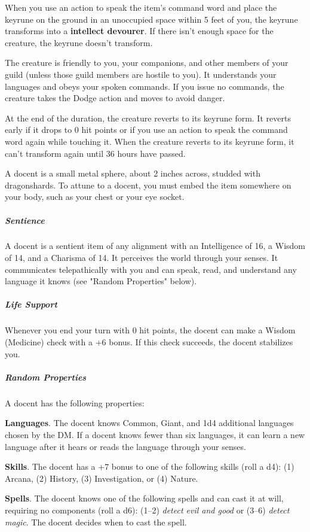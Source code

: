 \documentclass[10pt,a4paper,twoside,bg=print,twocolumn,openany,nodeprecatedcode]{dndbook}
\begin{document}
When you use an action to speak the item's command word and place the keyrune on the ground in an unoccupied space within 5 feet of you, the keyrune transforms into a \textbf{intellect devourer}. If there isn't enough space for the creature, the keyrune doesn't transform.

The creature is friendly to you, your companions, and other members of your guild (unless those guild members are hostile to you). It understands your languages and obeys your spoken commands. If you issue no commands, the creature takes the Dodge action and moves to avoid danger.

At the end of the duration, the creature reverts to its keyrune form. It reverts early if it drops to 0 hit points or if you use an action to speak the command word again while touching it. When the creature reverts to its keyrune form, it can't transform again until 36 hours have passed.

A docent is a small metal sphere, about 2 inches across, studded with dragonshards. To attune to a docent, you must embed the item somewhere on your body, such as your chest or your eye socket.

\subparagraph{Sentience}
A docent is a sentient item of any alignment with an Intelligence of 16, a Wisdom of 14, and a Charisma of 14. It perceives the world through your senses. It communicates telepathically with you and can speak, read, and understand any language it knows (see "Random Properties" below).

\subparagraph{Life Support}
Whenever you end your turn with 0 hit points, the docent can make a Wisdom (Medicine) check with a +6 bonus. If this check succeeds, the docent stabilizes you.

\subparagraph{Random Properties}
A docent has the following properties:

\textbf{Languages}. The docent knows Common, Giant, and 1d4 additional languages chosen by the DM. If a docent knows fewer than six languages, it can learn a new language after it hears or reads the language through your senses.

\textbf{Skills}. The docent has a +7 bonus to one of the following skills (roll a d4): (1) Arcana, (2) History, (3) Investigation, or (4) Nature.

\textbf{Spells}. The docent knows one of the following spells and can cast it at will, requiring no components (roll a d6): (1–2) \textit{detect evil and good} or (3–6) \textit{detect magic}. The docent decides when to cast the spell.
\end{document}
